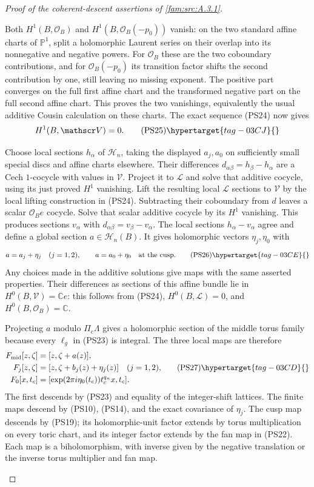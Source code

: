 \begin{proof}[Proof of the coherent-descent assertions of \cref{fam:src:A.3.1}]
\begin{enumerate}[label=\arabic*.,leftmargin=*]
Both $H^1(B,\mathcal O_B)$ and
$H^1(B,\mathcal O_B(-p_0))$ vanish: on the two standard affine
charts of $\mathbb P^1$, split a holomorphic Laurent series on
their overlap into its nonnegative and negative powers. For
$\mathcal O_B$ these are the two coboundary contributions, and
for $\mathcal O_B(-p_0)$ its transition factor shifts the second
contribution by one, still leaving no missing exponent. The positive
part converges on the full first affine chart and the transformed
negative part on the full second affine chart. This proves the two
vanishings, equivalently the usual additive Cousin calculation on
these charts. The exact sequence (PS24) now gives
\[
                             H^1(B,\mathscr V)=0.
 \tag{PS25}\hypertarget{tag-03CJ}{}\label{wb:pshift:eq:no-analytic-obstruction}
\]

Choose
local sections $h_\alpha$ of $\mathscr H_n$, taking the displayed
$a_j,a_0$ on sufficiently small special discs and affine charts
elsewhere. Their differences $d_{\alpha\beta}=h_\beta-h_\alpha$
are a Cech $1$-cocycle with values in $\mathscr V$. Project it to
$\mathcal L$ and solve that additive cocycle, using its just proved
$H^1$ vanishing. Lift the resulting local $\mathcal L$ sections to
$\mathscr V$ by the local lifting construction in (PS24). Subtracting
their coboundary from $d$ leaves a scalar $\mathcal O_Be$ cocycle.
Solve that scalar additive cocycle by its $H^1$ vanishing. This
produces sections $v_\alpha$ with
$d_{\alpha\beta}=v_\beta-v_\alpha$. The local sections
$h_\alpha-v_\alpha$ agree and define a global section
$a\in\mathscr H_n(B)$. It gives holomorphic vectors $\eta_j,\eta_0$ with
\[
 a=a_j+\eta_j\quad(j=1,2),\qquad a=a_0+\eta_0
                              \quad\hbox{at the cusp}.
 \tag{PS26}\hypertarget{tag-03CE}{}\label{wb:pshift:eq:global-correction}
\]
Any choices made in the additive solutions give maps with the same
asserted properties. Their differences as sections of this affine
bundle lie in $H^0(B,\mathscr V)=\mathbb C e$: this follows from
(PS24), $H^0(B,\mathcal L)=0$, and $H^0(B,\mathcal O_B)=\mathbb C$.

Projecting $a$ modulo $\Pi_c\Lambda$ gives a holomorphic section of
the middle torus family because every $\ell_g$ in (PS23) is integral.
The three local maps are therefore
\[
\begin{aligned}
 F_{\mathrm{mid}}[z,\zeta]&=[z,\zeta+a(z)],\\
 F_j[z,\zeta]&=[z,\zeta+b_j(z)+\eta_j(z)]\quad(j=1,2),\\
 F_0[x,t_c]&=[\exp(2\pi i\eta_0(t_c))t_c^{q_n}x,t_c].
\end{aligned}
\tag{PS27}\hypertarget{tag-03CD}{}\label{wb:pshift:eq:full-isomorphism}
\]
The first descends by (PS23) and equality of the integer-shift
lattices. The finite maps descend by (PS10), (PS14), and the exact
covariance of $\eta_j$. The cusp map descends by (PS19); its
holomorphic-unit factor extends by torus multiplication on every
toric chart, and its integer factor extends by the fan map in
(PS22). Each map is a biholomorphism, with inverse given by the
negative translation or the inverse torus multiplier and fan map.


\end{enumerate}
\end{proof}
